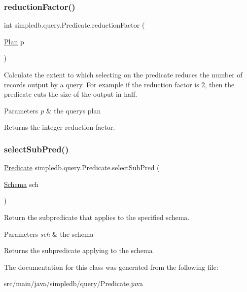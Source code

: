\subsubsection{\texorpdfstring{reduction\+Factor()}{reductionFactor()}}
{\footnotesize\ttfamily int simpledb.\+query.\+Predicate.\+reduction\+Factor (\begin{DoxyParamCaption}\item[{\hyperlink{interfacesimpledb_1_1plan_1_1Plan}{Plan}}]{p }\end{DoxyParamCaption})\hspace{0.3cm}{\ttfamily [inline]}}

Calculate the extent to which selecting on the predicate reduces the number of records output by a query. For example if the reduction factor is 2, then the predicate cuts the size of the output in half. 
\begin{DoxyParams}{Parameters}
{\em p} & the query\textquotesingle{}s plan \\
\hline
\end{DoxyParams}
\begin{DoxyReturn}{Returns}
the integer reduction factor. 
\end{DoxyReturn}
\mbox{\label{classsimpledb_1_1query_1_1Predicate_a4f8ab1bd25e5bdf45076190ebb290524}} 
\subsubsection{\texorpdfstring{select\+Sub\+Pred()}{selectSubPred()}}
{\footnotesize\ttfamily \hyperlink{classsimpledb_1_1query_1_1Predicate}{Predicate} simpledb.\+query.\+Predicate.\+select\+Sub\+Pred (\begin{DoxyParamCaption}\item[{\hyperlink{classsimpledb_1_1record_1_1Schema}{Schema}}]{sch }\end{DoxyParamCaption})\hspace{0.3cm}{\ttfamily [inline]}}

Return the subpredicate that applies to the specified schema. 
\begin{DoxyParams}{Parameters}
{\em sch} & the schema \\
\hline
\end{DoxyParams}
\begin{DoxyReturn}{Returns}
the subpredicate applying to the schema 
\end{DoxyReturn}


The documentation for this class was generated from the following file\+:\begin{DoxyCompactItemize}
\item 
src/main/java/simpledb/query/Predicate.\+java\end{DoxyCompactItemize}
